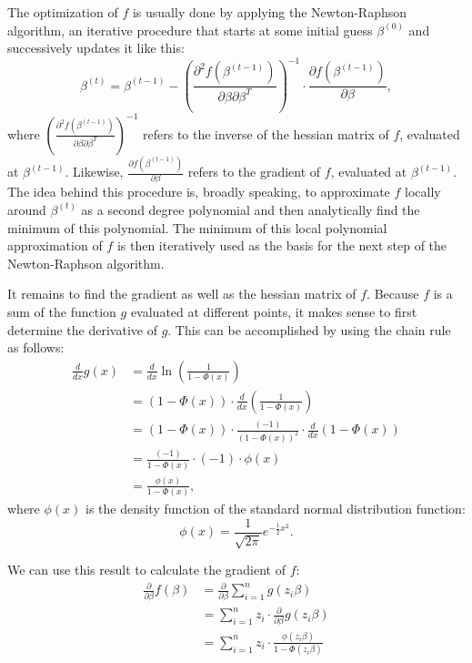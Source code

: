 The optimization of $f$ is usually done by applying the
Newton-Raphson algorithm, an iterative procedure that
starts at some initial guess $\beta^{(0)}$ and successively
updates it like this:
\begin{equation}
    \beta^{(t)} = \beta^{(t-1)} - \left(\frac{\partial^2f(\beta^{(t-1)})}{\partial\beta\partial\beta^T}\right)^{-1}
    \cdot \frac{\partial f(\beta^{(t-1)})}{\partial\beta},
\end{equation}
where $\left(\frac{\partial^2f(\beta^{(t-1)})}{\partial\beta\partial\beta^T}\right)^{-1}$
refers to the inverse of the hessian matrix of $f$, evaluated at
$\beta^{(t-1)}$. Likewise, $\frac{\partial f(\beta^{(t-1)})}{\partial\beta}$
refers to the gradient of $f$, evaluated at $\beta^{(t-1)}$.
The idea behind this procedure is, broadly speaking, to approximate
$f$ locally around $\beta^{(t)}$ as a second degree polynomial and then
analytically find the minimum of this polynomial. The minimum of this
local polynomial approximation of $f$ is then
iteratively used as the basis for the next step of the
Newton-Raphson algorithm.

It remains to find the gradient as well as the hessian matrix of $f$.
Because $f$ is a sum of the function $g$ evaluated at different points,
it makes sense to first determine the derivative of $g$.
This can be accomplished by using the chain rule as follows:
\begin{equation}
    \begin{split}
        \frac{d}{dx}g(x)
        & = \frac{d}{dx} \ln \left(\frac{1}{1 - \Phi(x)}\right)                 \\
        & = (1 - \Phi(x)) \cdot \frac{d}{dx} \left(\frac{1}{1 - \Phi(x)}\right) \\
        & = (1 - \Phi(x)) \cdot \frac{(-1)}{(1 - \Phi(x))^2} \cdot \frac{d}{dx} (1 - \Phi(x)) \\
        & = \frac{(-1)}{1 - \Phi(x)} \cdot (-1) \cdot \phi(x) \\
        & = \frac{\phi(x)}{1 - \Phi(x)},
    \end{split}
\end{equation}
where $\phi(x)$ is the density function of the standard normal distribution function:
\begin{equation*}
    \phi(x) = \frac{1}{\sqrt{2 \pi}} e^{-\frac{1}{2} x^2}.
\end{equation*}

\noindent We can use this result to calculate the gradient of $f$:
\begin{equation}
    \begin{split}
        \frac{\partial}{\partial \beta} f(\beta)
        & = \frac{\partial}{\partial \beta} \sum_{i=1}^n g(z_i \beta) \\
        & = \sum_{i=1}^n z_i \cdot \frac{\partial}{\partial \beta} g(z_i \beta) \\
        & = \sum_{i=1}^n z_i \cdot \frac{\phi(z_i\beta)}{1 - \Phi(z_i \beta)}
    \end{split}
\end{equation}

